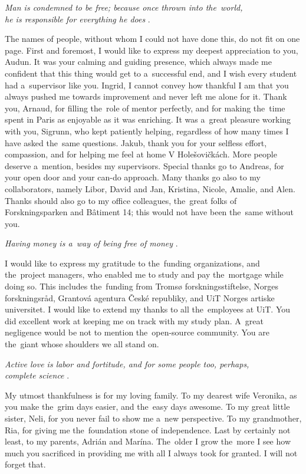 \begin{center}
    \textit{Man is condemned to be free; because once thrown into the~world,\\ he is responsible for everything he does} \citep{sartre1956being}.
\end{center}
The names of people, without whom I could not have done this, do not fit on one page. First and foremost, I would like to express my deepest appreciation to you, Audun. It was your calming and guiding presence, which always made me confident that this thing would get to a~successful end, and I wish every student had a~supervisor like you. Ingrid, I cannot convey how thankful I am that you always pushed me towards improvement and never left me alone for it. Thank you, Arnaud, for filling the~role of mentor perfectly, and for making the~time spent in Paris as enjoyable as it was enriching. It was a~great pleasure working with you, Sigrunn, who kept patiently helping, regardless of how many times I have asked the~same questions. Jakub, thank you for your selfless effort, compassion, and for helping me feel at home V Holešovičkách. More people deserve a~mention, besides my supervisors. Special thanks go to Andreas, for your open door and your can-do approach. Many thanks go also to my collaborators, namely Libor, David and Jan, Kristina, Nicole, Amalie, and Alen. Thanks should also go to my office colleagues, the~great folks of Forskningsparken and Bâtiment 14; this would not have been the~same without you. 
\begin{center}
\textit{Having money is a~way of being free of money} \citep{camus1972happy}. 
\end{center}
I would like to express my gratitude to the~funding organizations, and the~project managers, who enabled me to study and pay the~mortgage while doing so. This includes the~funding from Tromsø forskningsstiftelse, Norges forskningsråd, Grantová agentura České republiky, and UiT Norges artiske universitet. I would like to extend my thanks to all the~employees at UiT. You did excellent work at keeping me on track with my study plan. A~great negligence would be not to mention the~open-source community. You are the~giant whose shoulders we all stand on. 
\begin{center}
\textit{Active love is labor and fortitude, and for some people too, perhaps,\\ complete science} \citep{dostoyevskii1880brothers}.
\end{center}
My utmost thankfulness is for my loving family. To my dearest wife Veronika, as you make the~grim days easier, and the~easy days awesome. To my great little sister, Neli, for you never fail to show me a~new perspective. To my grandmother, Ria, for giving me the~foundation stone of independence. Last by certainly not least, to my parents, Adrián and Marína. The~older I grow the~more I see how much you sacrificed in providing me with all I always took for granted. I will not forget that.